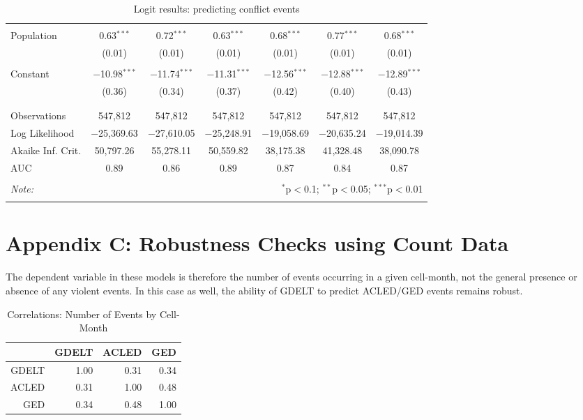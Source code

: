 \documentclass[hidelinks]{article}
\begin{document}
\begin{table}[!htbp]
\begin{tabular}{@{\extracolsep{5pt}}lcccccc}
  & & & & & & \\ 
Population & 0.63$^{***}$ & 0.72$^{***}$ & 0.63$^{***}$ & 0.68$^{***}$ & 0.77$^{***}$ & 0.68$^{***}$ \\ 
  & (0.01) & (0.01) & (0.01) & (0.01) & (0.01) & (0.01) \\ 
  & & & & & & \\ 
 Constant & $-$10.98$^{***}$ & $-$11.74$^{***}$ & $-$11.31$^{***}$ & $-$12.56$^{***}$ & $-$12.88$^{***}$ & $-$12.89$^{***}$ \\ 
  & (0.36) & (0.34) & (0.37) & (0.42) & (0.40) & (0.43) \\ 
  & & & & & & \\ 
\hline \\[-1.8ex] 
Observations & 547,812 & 547,812 & 547,812 & 547,812 & 547,812 & 547,812 \\ 
Log Likelihood & $-$25,369.63 & $-$27,610.05 & $-$25,248.91 & $-$19,058.69 & $-$20,635.24 & $-$19,014.39 \\ 
Akaike Inf. Crit. & 50,797.26 & 55,278.11 & 50,559.82 & 38,175.38 & 41,328.48 & 38,090.78 \\ 
AUC & 0.89 & 0.86 & 0.89 & 0.87 & 0.84 & 0.87\\
\hline 
\hline \\[-1.8ex] 
\textit{Note:}  & \multicolumn{6}{r}{$^{*}$p$<$0.1; $^{**}$p$<$0.05; $^{***}$p$<$0.01} \\ 
\normalsize 
\end{tabular}
\caption{Logit results: predicting conflict events}
\end{table} 


\section*{Appendix C: Robustness Checks using Count Data}
The dependent variable in these models is therefore the number of events occurring in a given cell-month, not the general presence or absence of any violent events. In this case as well, the ability of GDELT to predict ACLED/GED events remains robust.

\begin{table}[ht]
\centering
\begin{tabular}{rrrr}
  \hline
 & GDELT & ACLED & GED \\ 
  \hline
GDELT & 1.00 & 0.31 & 0.34 \\ 
  ACLED & 0.31 & 1.00 & 0.48 \\ 
GED & 0.34 & 0.48 & 1.00 \\ 
   \hline
\end{tabular}
\caption{Correlations: Number of Events by Cell-Month} 
\end{table}
\end{document}
